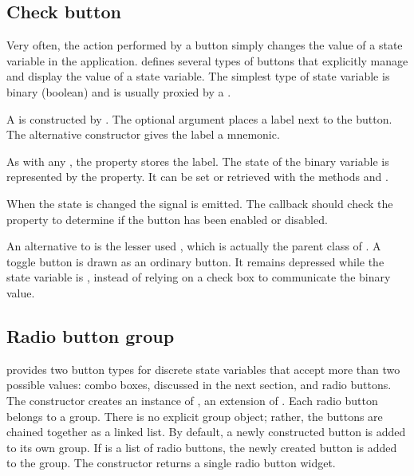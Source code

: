 
\subsection{Check button}
\label{sec:RGtk2:gtkCheckbox}

Very often, the action performed by a button simply changes the value
of a state variable in the application. \GTK\/ defines several types
of buttons that explicitly manage and display the value of a state
variable. The simplest type of state variable is binary (boolean) and is
usually proxied by a . 

A  is constructed by
. The optional argument
 places a label next to the
button. The alternative constructor
 gives the label a mnemonic.

As with any , the  property stores the
label.  The state of the binary variable is represented by the
 property. It can be set or retrieved with the methods
 and
.

When the state is changed the  signal is emitted. The
callback should check the  property to determine if the
button has been enabled or disabled.

An alternative to  is the lesser used
, which is actually the parent class of
. A toggle button is drawn as an ordinary
button. It remains depressed while the state variable is ,
instead of relying on a check box to communicate the binary value.

\subsection{Radio button group}
\label{sec:RGtk2:gtkRadioButton}

\GTK\/ provides two button types for discrete state variables that
accept more than two possible values: combo boxes, discussed in the
next section, and radio buttons. The 
constructor creates an instance of , an
extension of . Each radio button belongs to a
group.  There is no explicit group object; rather, the buttons are
chained together as a linked list. By default, a newly constructed
button is added to its own group. If 
is a list of radio buttons, the newly created button is added to the
group. The constructor returns a single radio button widget.

